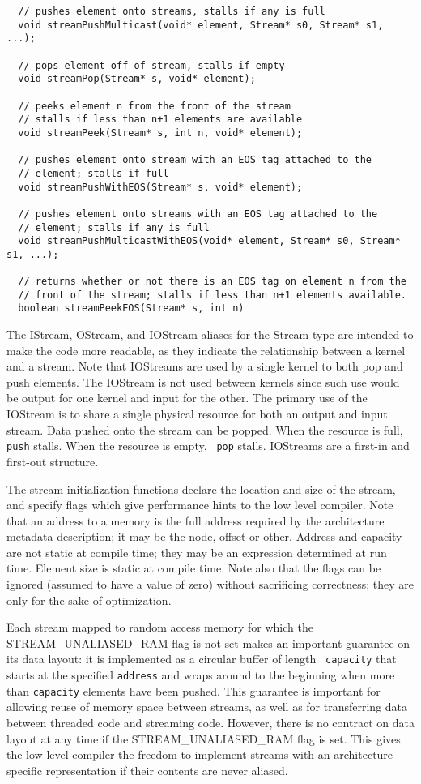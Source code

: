 {\begin{verbatim}
  // pushes element onto streams, stalls if any is full
  void streamPushMulticast(void* element, Stream* s0, Stream* s1, ...);
  
  // pops element off of stream, stalls if empty
  void streamPop(Stream* s, void* element);
  
  // peeks element n from the front of the stream
  // stalls if less than n+1 elements are available
  void streamPeek(Stream* s, int n, void* element);

  // pushes element onto stream with an EOS tag attached to the
  // element; stalls if full
  void streamPushWithEOS(Stream* s, void* element);

  // pushes element onto streams with an EOS tag attached to the
  // element; stalls if any is full
  void streamPushMulticastWithEOS(void* element, Stream* s0, Stream* s1, ...);

  // returns whether or not there is an EOS tag on element n from the
  // front of the stream; stalls if less than n+1 elements available.
  boolean streamPeekEOS(Stream* s, int n)
\end{verbatim}}

 The IStream, OStream, and IOStream aliases for the
Stream type are intended to make the code more readable, as they
indicate the relationship between a kernel and a stream.  Note that
IOStreams are used by a single kernel to both pop and push elements.
The IOStream is not used between kernels since such use would be
output for one kernel and input for the other. The primary use of the
IOStream is to share a single physical resource for both an output and
input stream.  Data pushed onto the stream can be popped.  When the
resource is full, {\tt push} stalls.  When the resource is empty, {\tt
pop} stalls.  IOStreams are a first-in and first-out structure.

 The stream initialization functions
declare the location and size of the stream, and specify flags which
give performance hints to the low level compiler.  Note that an
address to a memory is the full address required by the architecture
metadata description; it may be the node, offset or other.  Address
and capacity are not static at compile time; they may be an expression
determined at run time.  Element size is static at compile time.  Note
also that the flags can be ignored (assumed to have a value of zero)
without sacrificing correctness; they are only for the sake of
optimization.

Each stream mapped to random access memory for which the
STREAM\_UNALIASED\_RAM flag is not set makes an important guarantee on
its data layout: it is implemented as a circular buffer of length {\tt
capacity} that starts at the specified {\tt address} and wraps around
to the beginning when more than {\tt capacity} elements have been
pushed.  This guarantee is important for allowing reuse of memory
space between streams, as well as for transferring data between
threaded code and streaming code.  However, there is no contract on
data layout at any time if the STREAM\_UNALIASED\_RAM flag is
set. This gives the low-level compiler the freedom to implement
streams with an architecture-specific representation if their contents
are never aliased.

